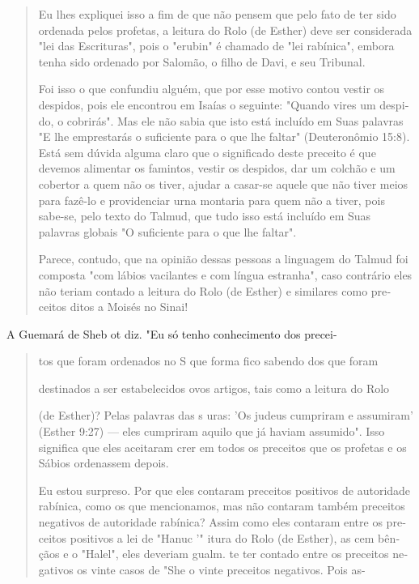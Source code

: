 \begin{quote}
Eu lhes expliquei isso a fim de que não pensem que pelo fato de ter sido
ordenada pelos profetas, a leitura do Rolo (de Esther) deve ser
considera­da "lei das Escrituras", pois o "erubin" é chamado de "lei
rabínica", embora tenha sido ordenado por Salomão, o filho de Davi, e
seu Tribunal.

Foi isso o que confundiu alguém, que por esse motivo contou vestir os
despidos, pois ele encontrou em Isaías o seguinte: "Quando vires um
despi­do, o cobrirás". Mas ele não sabia que isto está incluído em Suas
palavras "E lhe emprestarás o suficiente para o que lhe faltar"
(Deuteronômio 15:8). Está sem dúvida alguma claro que o significado
deste preceito é que devemos ali­mentar os famintos, vestir os despidos,
dar um colchão e um cobertor a quem não os tiver, ajudar a casar-se
aquele que não tiver meios para fazê-lo e provi­denciar urna montaria
para quem não a tiver, pois sabe-se, pelo texto do Tal­mud, que tudo
isso está incluído em Suas palavras globais "O suficiente para o que lhe
faltar".

Parece, contudo, que na opinião dessas pessoas a linguagem do Tal­mud
foi composta "com lábios vacilantes e com língua estranha", caso
contrá­rio eles não teriam contado a leitura do Rolo (de Esther) e
similares como pre­ceitos ditos a Moisés no Sinai!
\end{quote}

A Guemará de Sheb ot diz. "Eu só tenho conhecimento dos precei-

\begin{quote}
tos que foram ordenados no S que forma fico sabendo dos que foram

destinados a ser estabelecidos ovos artigos, tais como a leitura do Rolo

(de Esther)? Pelas palavras das s uras: 'Os judeus cumpriram e
assumiram' (Esther 9:27) --- eles cumpriram aquilo que já haviam
assumido". Isso significa que eles aceitaram crer em todos os preceitos
que os profetas e os Sábios orde­nassem depois.

Eu estou surpreso. Por que eles contaram preceitos positivos de
au­toridade rabínica, como os que mencionamos, mas não contaram também
pre­ceitos negativos de autoridade rabínica? Assim como eles contaram
entre os pre­ceitos positivos a lei de "Hanuc '" itura do Rolo (de
Esther), as cem bên­çãos e o "Halel", eles deveriam gualm. te ter
contado entre os preceitos ne­gativos os vinte casos de "She o vinte
preceitos negativos. Pois as-
\end{quote}

